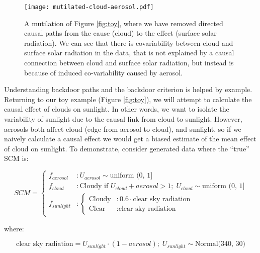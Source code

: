 \documentclass[12pt]{article}
\begin{document}
\begin{figure}
  \noindent\texttt{[image: mutilated-cloud-aerosol.pdf]}\\
  \caption{A mutilation of Figure \ref{fig:toy}, where we have removed
    directed causal paths from the cause (cloud) to the effect (surface
    solar radiation). We can see that there is covariability between
    cloud and surface solar radiation in the data, that is not
    explained by a causal connection between cloud and surface solar
    radiation, but instead is because of induced co-variability caused
    by aerosol.}
  \label{fig:mutilated-toy}
\end{figure}

Understanding backdoor paths and the backdoor criterion is helped by
example. Returning to our toy example (Figure \ref{fig:toy}), we will
attempt to calculate the causal effect of clouds on sunlight. In other
words, we want to isolate the variability of sunlight due to the
causal link from cloud to sunlight. However, aerosols both affect
cloud (edge from aerosol to cloud), and sunlight, so if we naively
calculate a causal effect we would get a biased estimate of the mean
effect of cloud on sunlight. To demonstrate, consider generated
data where the ``true'' SCM is:

\begin{equation}
  SCM =
  \begin{cases}
    f_{aerosol} &: U_{aerosol} \sim \text{uniform (0, 1]}\\
    f_{cloud} &: \text{Cloudy if } U_{cloud} + aerosol > 1; \;
    U_{cloud} \sim \text{uniform (0, 1]}\\
    f_{sunlight} &: \begin{cases}
      \text{Cloudy} &: 0.6 \cdot \text{clear sky radiation}  \\
      \text{Clear} &: \text{clear sky radiation}
    \end{cases}
  \end{cases}
\end{equation}

where:

\begin{equation*}
  \text{clear sky radiation} = U_{sunlight} \cdot (1 - aerosol); \;
  U_{sunlight} \sim \text{Normal(340, 30)}
\end{equation*}
\end{document}
